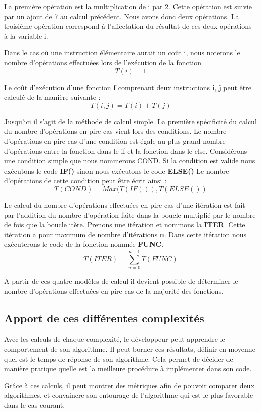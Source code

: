 \documentclass[12pt, twoside, openright]{report}
\begin{document}
La première opération est la multiplication de i par 2. Cette opération est suivie par un ajout de 7 au calcul précédent. Nous avons donc deux opérations. La troisième opération correspond à l'affectation du résultat de ces deux opérations à la variable i. 

Dans le cas où une instruction élémentaire aurait un coût i, nous noterons le nombre d'opérations effectuées lors de l'exécution de la fonction 
\[{T(i)=1}\]

Le coût d'exécution d'une fonction \textbf{f} comprenant deux instructions  \textbf{i}, \textbf{j} peut être calculé de la manière suivante : 
\[{T(i,j)=T(i)+T(j)}\]

Jusqu'ici il s'agit de la méthode de calcul simple. La première spécificité du calcul du nombre d'opérations en pire cas vient lors des conditions. Le nombre d'opérations en pire cas d'une condition est égale au plus grand nombre d'opérations entre la fonction dans le if et la fonction dans le else. Considérons une condition simple que nous nommerons COND. Si la condition est valide nous exécutons le code \textbf{IF()} sinon nous exécutons le code \textbf{ELSE()} Le nombre d'opérations de cette condition peut être écrit ainsi :
\[{T(COND)=Max(T(IF()), T(ELSE())}\]

Le calcul du nombre d'opérations effectuées en pire cas d'une itération est fait par l'addition du nombre d'opération faite dans la boucle multiplié par le nombre de fois que la boucle itère. Prenons une itération et nommons la \textbf{ITER}. Cette itération a pour maximum de nombre d'itérations \textbf{n}. Dans cette itération nous exécuterons le code de la fonction nommée \textbf{FUNC}.
\[{T(ITER)= \sum_{n=0}^{n-1} T(FUNC)}\]

A partir de ces quatre modèles de calcul il devient possible de déterminer le nombre d'opérations effectuées en pire cas de la majorité des fonctions.

\subsection{Apport de ces différentes complexités}

Avec les calculs de chaque complexité, le développeur peut apprendre le comportement de son algorithme. Il peut borner ces résultats, définir en moyenne quel est le temps de réponse de son algorithme. Cela permet de décider de manière pratique quelle est la meilleure procédure à implémenter dans son code. 

Grâce à ces calculs, il peut montrer des métriques afin de pouvoir comparer deux algorithmes, et convaincre son entourage de l'algorithme qui est le plus favorable dans le cas courant.
\end{document}
